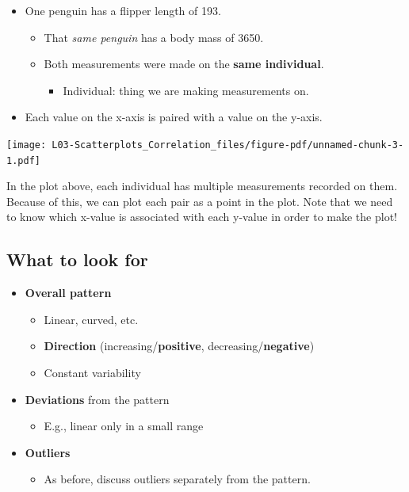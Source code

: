 \documentclass[
  letterpaper,
  DIV=11,
  numbers=noendperiod,
  oneside]{scrreprt}
\providecommand{\tightlist}{%
  \setlength{\itemsep}{0pt}\setlength{\parskip}{0pt}}\usepackage{longtable,booktabs,array}
\begin{document}
\begin{itemize}
\tightlist
\item
  One penguin has a flipper length of 193.

  \begin{itemize}
  \tightlist
  \item
    That \emph{same penguin} has a body mass of 3650.
  \item
    Both measurements were made on the \textbf{same individual}.

    \begin{itemize}
    \tightlist
    \item
      Individual: thing we are making measurements on.\lspace
    \end{itemize}
  \end{itemize}
\item
  Each value on the x-axis is paired with a value on the y-axis.
\end{itemize}

\texttt{[image: L03-Scatterplots\_Correlation\_files/figure-pdf/unnamed-chunk-3-1.pdf]}

In the plot above, each individual has multiple measurements recorded on
them. Because of this, we can plot each pair as a point in the plot.
Note that we need to know which x-value is associated with each y-value
in order to make the plot!

\hypertarget{what-to-look-for}{%
\subsection{What to look for}\label{what-to-look-for}}

\begin{itemize}
\tightlist
\item
  \textbf{Overall pattern}

  \begin{itemize}
  \tightlist
  \item
    Linear, curved, etc.
  \item
    \textbf{Direction} (increasing/\textbf{positive},
    decreasing/\textbf{negative})
  \item
    Constant variability
  \end{itemize}
\item
  \textbf{Deviations} from the pattern

  \begin{itemize}
  \tightlist
  \item
    E.g., linear only in a small range
  \end{itemize}
\item
  \textbf{Outliers}

  \begin{itemize}
  \tightlist
  \item
    As before, discuss outliers separately from the pattern.
  \end{itemize}
\end{itemize}
\end{document}
